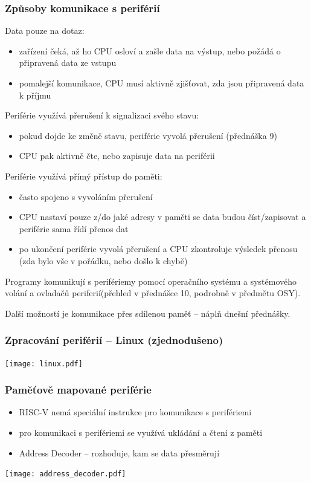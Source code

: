 \documentclass{beamer}
\begin{document}
\begin{frame}
\frametitle{Způsoby komunikace s periférií}
Data pouze na dotaz:
\begin{itemize}
\item zařízení čeká, až ho CPU osloví a zašle data na výstup, nebo požádá o připravená data ze vstupu
\item pomalejší komunikace, CPU musí aktivně zjišťovat, zda jsou připravená data k příjmu
\end{itemize}

Periférie využívá přerušení k signalizaci svého stavu:
\begin{itemize}
\item pokud dojde ke změně stavu, periférie vyvolá přerušení (přednáška 9)
\item CPU pak aktivně čte, nebo zapisuje data na periférii
\end{itemize}

Periférie využívá přímý přístup do paměti:
\begin{itemize}
\item často spojeno s vyvoláním přerušení
\item CPU nastaví pouze z/do jaké adresy v paměti se data budou číst/zapisovat a periférie sama řídí přenos dat
\item po ukončení periférie vyvolá přerušení a CPU zkontroluje výsledek přenosu (zda bylo vše v pořádku, nebo došlo k chybě)
\end{itemize}

Programy komunikují s perifériemy pomocí operačního systému a systémového volání a ovladačů periferií(přehled v přednášce 10, podrobně v předmětu OSY).

Další možností je komunikace přes sdílenou paměť -- náplň dnešní přednášky.
\end{frame}

\begin{frame}
\frametitle{Zpracování periférií -- Linux (zjednodušeno)}

\begin{center}
\texttt{[image: linux.pdf]}
\end{center}
\end{frame}

\begin{frame}
\frametitle{Paměťově mapované periférie}

\begin{itemize}
\item RISC-V nemá speciální instrukce pro komunikace s perifériemi
\item pro komunikaci s perifériemi se využívá ukládání a čtení z paměti
\item Address Decoder -- rozhoduje, kam se data přesměrují
\end{itemize}
\begin{center}
\texttt{[image: address\_decoder.pdf]}
\end{center}
\end{frame}
\end{document}
